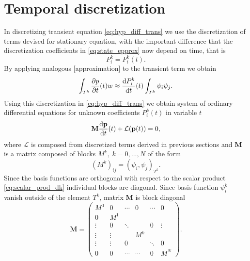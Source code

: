 \newpage
\section{Temporal discretization}
\label{se:time_theory}
%
In discretizing transient equation \eqref{eq:hyp_diff_trans} we use the 
discretization of terms devised for stationary equation, with the important 
difference that the discretization coefficients in \eqref{eq:state_epprox} now 
depend on time, that is
\begin{equation}
	P^k_i = P^k_i(t).
\end{equation}
By applying analogous [approximation] to the transient term we obtain
\begin{equation}
	\int_{T^k}\frac{\partial p}{\partial t}(t)w \approx  \frac{\text{d}P^k_i}{\text{d}t}(t)\int_{T^k}\psi_i\psi_j. 
\end{equation}
Using this discretization in \eqref{eq:hyp_diff_trans} we obtain system of 
ordinary differential equations for unknown coefficients 
$P^k_i(t)$ in variable $t$
\begin{equation}\label{eq:time_diff}
	\mathbf{M}  \frac{\text{d}\mathbf{p}}{\text{d}t}(t) + \mathcal{L}(\mathbf{p}(t)) = 0,
\end{equation}
where $\mathcal{L}$  is composed from discretized terms  derived in previous 
sections and $\mathbf{M}$ is a matrix composed of blocks $M^k,\; k=0, \ldots , N$ of the 
form
\begin{equation}
(M^k)_{ij} = ( \psi_i,\psi_j)_{T^k}.
\end{equation}
Since the basis functions are orthogonal with respect to the scalar product 
\eqref{eq:scalar_prod_dk} individual blocks are diagonal. Since basis function 
$\psi^k_i$ vanish outside of the element $T^k$, matrix $\mathbf{M}$ is block diagonal 
\begin{equation}
\mathbf{M}  = \begin{pmatrix}
		M^0      &    0   &\cdots&  0   &\cdots&0\\
		0		 &   M^1  &      &      &      &\\
		\vdots	 &    0   &\ddots&      &  0   &\vdots\\
	  \vdots     & \vdots &      & M^k  &      &\\
		\vdots   & \vdots & 0    &      &\ddots&0\\
		0    	 &   0    &\cdots&\cdots&   0  &M^{N} 
	\end{pmatrix}.
\end{equation}
